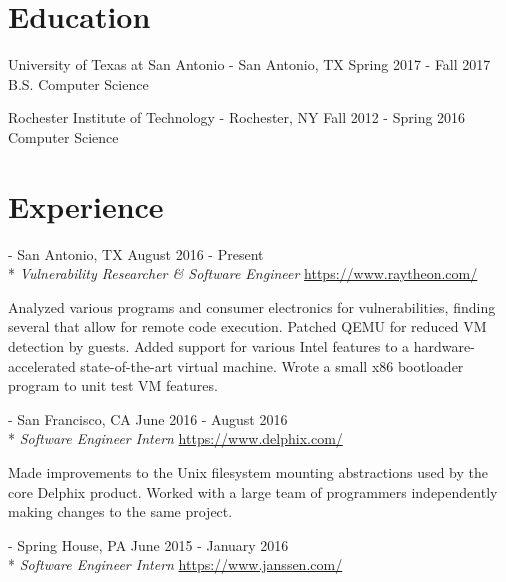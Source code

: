 \documentclass[letterpaper,margin,line,11pt]{resume}
\newcommand{\rurl}[1]{\hfill {\footnotesize \url{#1}}}
\newcommand{\rdate}[1]{\hfill {\small #1}}
\renewcommand{\employer}[5]{\item[#1] - #2 \rdate{#3} \\* #4 \rurl{#5}}
\begin{document}
\begin{resume}
\section{\mysidestyle Education}
    \begin{compactdesc}
        \item[University of Texas at San Antonio] - San Antonio, TX \rdate{Spring 2017 - Fall 2017}
        \small
        \\B.S. Computer Science
    \end{compactdesc}
    \begin{compactdesc}
        \item[Rochester Institute of Technology] - Rochester, NY \rdate{Fall 2012 - Spring 2016}
        \small
        \\Computer Science
    \end{compactdesc}

\section{\mysidestyle Experience}
    \begin{asparadesc}
        \employer{Raytheon}{San Antonio, TX} {August 2016 - Present}{\textit{Vulnerability Researcher \& Software Engineer}}{https://www.raytheon.com/}

        \small
	Analyzed various programs and consumer electronics for vulnerabilities, finding several that allow for remote
        code execution. Patched QEMU for reduced VM detection by guests. Added support for various Intel features to a
        hardware-accelerated state-of-the-art virtual machine. Wrote a small x86 bootloader program to unit test VM features.
        \normalsize
        \\

        \employer{Delphix}{San Francisco, CA} {June 2016 - August 2016}{\textit{Software Engineer Intern}}{https://www.delphix.com/}

        \small
        Made improvements to the Unix filesystem mounting abstractions used by the core Delphix product. Worked with a
        large team of programmers independently making changes to the same project.
        \normalsize
        \\

        \employer{Janssen Biotech}{Spring House, PA}{June 2015 - January 2016}{\textit{Software Engineer Intern}}{https://www.janssen.com/}


\end{asparadesc}
\end{resume}
\end{document}

